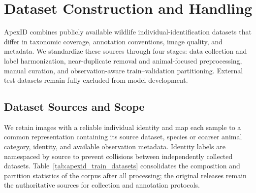 \section{Dataset Construction and Handling}
\label{sec:dataset}

ApexID combines publicly available wildlife individual-identification datasets
that differ in taxonomic coverage, annotation conventions, image quality, and
metadata. We standardize these sources through four stages: data collection and
label harmonization, near-duplicate removal and animal-focused preprocessing,
manual curation, and observation-aware train--validation partitioning. External
test datasets remain fully excluded from model development.

\subsection{Dataset Sources and Scope}
\label{sec:dataset:sources}

We retain images with a reliable individual identity and map each sample to a
common representation containing its source dataset, species or coarser animal
category, identity, and available observation metadata. Identity labels are
namespaced by source to prevent collisions between independently collected
datasets. Table~\ref{tab:apexid_train_datasets} consolidates the composition and
partition statistics of the corpus after all processing; the original releases
remain the authoritative sources for collection and annotation protocols.

